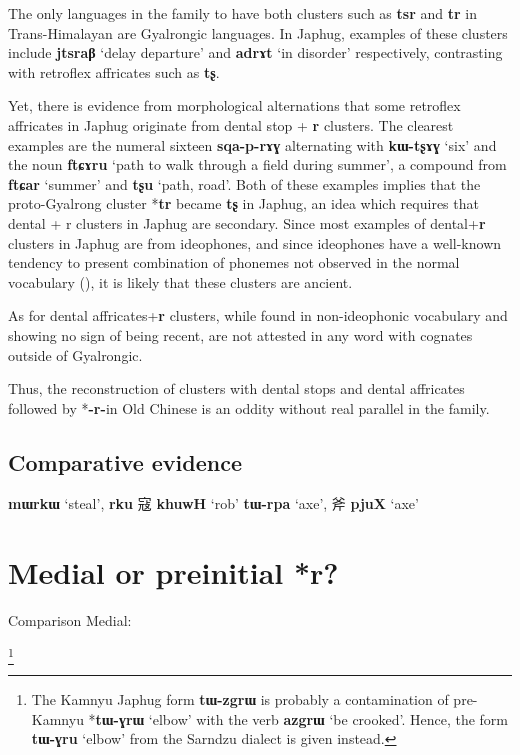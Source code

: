 \documentclass[oneside,a4paper,11pt]{article}
\newcommand{\ipa}[1]{{\phon\mbox{\textbf{#1}}}}
\newcommand{\zh}[1]{{\cn #1}}
\newcommand{\ch}[3]{\zh{#1} \ipa{#2} `#3'}
\begin{document}
The only languages in the family to have both clusters such as \ipa{tsr} and \ipa{tr} in Trans-Himalayan are Gyalrongic languages. In Japhug, examples of these clusters include \ipa{jtsraβ} `delay departure' and \ipa{adrɤt} `in disorder' respectively, contrasting with retroflex affricates such as \ipa{tʂ}.

Yet, there is evidence from morphological alternations that some retroflex affricates in Japhug originate from dental stop + \ipa{r} clusters. The clearest examples are the numeral sixteen \ipa{sqa-p-rɤɣ} alternating with \ipa{kɯ-tʂɤɣ} `six' and the noun \ipa{ftɕɤru} `path to walk through a field during summer', a compound from \ipa{ftɕar} `summer' and \ipa{tʂu} `path, road'. Both of these examples implies that the proto-Gyalrong cluster *\ipa{tr} became \ipa{tʂ} in Japhug, an idea which requires that dental + r clusters in Japhug are secondary. Since most examples of dental+\ipa{r} clusters in Japhug are from ideophones, and since ideophones have a well-known tendency to present combination of phonemes not observed in the normal vocabulary (\citealt{japhug14ideophones}), it is likely that these clusters are ancient.

As for dental affricates+\ipa{r} clusters, while found in non-ideophonic vocabulary and showing no sign of being recent, are not attested in any word with cognates outside of Gyalrongic. 


Thus, the reconstruction of clusters with dental stops and dental affricates followed by *\ipa{-r-}in Old Chinese is an oddity without real parallel in the family.
%

\subsection{Comparative evidence}
\ipa{mɯrkɯ} `steal', \ipa{rku} \ch{寇}{khuwH}{rob} 
\ipa{tɯ-rpa} `axe', \ch{斧}{pjuX}{axe}

\section{Medial or preinitial *r?}
Comparison \citet{coblin86handlist}
Medial:
\citet{gong95st}
\citet{jacques15sr}

\footnote{The Kamnyu Japhug form \ipa{tɯ-zgrɯ} is probably a contamination of  pre-Kamnyu *\ipa{tɯ-ɣrɯ} `elbow' with the verb \ipa{azgrɯ} `be crooked'. Hence, the form \ipa{tɯ-ɣru} `elbow' from the Sarndzu dialect is given instead.}
\end{document}
